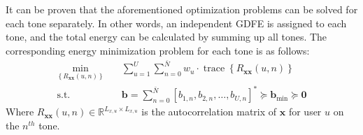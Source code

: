 It can be proven that the aforementioned optimization problems can be solved for each tone separately. In other words, an independent GDFE is assigned to each tone, and the total energy can be calculated by summing up all tones\cite{book}. The corresponding energy minimization problem for each tone is as follows:
\begin{equation} \label{tonalE}
    \begin{aligned}
        \min_{\left\{R_{\boldsymbol{x} \boldsymbol{x}}{(u, n)}\right\}} \quad &\sum_{u=1}^U \sum_{n=0}^{\bar{N}} w_u \cdot \operatorname{trace}\left\{R_{\boldsymbol{x} \boldsymbol{x}}(u, n)\right\} \\
        \textrm{s.t.} \quad &\mathbf{b}=\sum_{n=0}^{\bar{N}}\left[b_{1, n}, b_{2, n}, \ldots ,b_{U, n}\right]^* \succeq \boldsymbol{b}_{\min } \succeq \mathbf{0}
    \end{aligned}
\end{equation}
Where $R_{\boldsymbol{xx}}(u,n)\in\mathbb{R}^{L_{x,u}\times L_{x,u}}$ is the autocorrelation matrix of $\boldsymbol{x}$ for user $u$ on the $n^{th}$ tone. 

